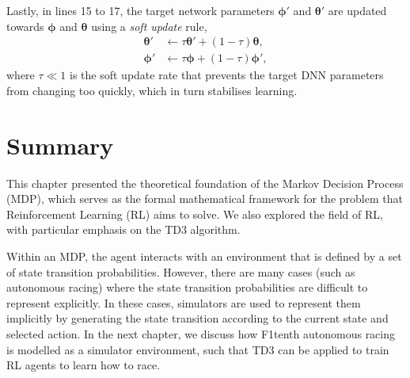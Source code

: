 Lastly, in lines 15 to 17, the target network parameters $\bm{\phi}'$ and $\bm{\theta}'$ are updated towards $\bm{\phi}$ and $\bm{\theta}$ using a \emph{soft update} rule, 
\begin{equation}
\begin{split}
    \bm{\theta}' &\leftarrow \tau \bm{\theta}' + (1 - \tau) \bm{\theta}, \\
    \bm{\phi}' &\leftarrow \tau \bm{\phi} + (1 - \tau) \bm{\phi}',
\end{split}
\end{equation}
where $\tau \ll 1$ is the soft update rate that prevents the target DNN parameters from changing too quickly, which in turn stabilises learning. 



\section{Summary}

This chapter presented the theoretical foundation of the Markov Decision Process (MDP), which serves as the formal mathematical framework for the problem that Reinforcement Learning (RL) aims to solve.
We also explored the field of RL, with particular emphasis on the TD3 algorithm.
 

Within an MDP, the agent interacts with an environment that is defined by a set of state transition probabilities. 
However, there are many cases (such as autonomous racing) where the state transition probabilities are difficult to represent explicitly.
In these cases, simulators are used to represent them implicitly by generating the state transition according to the current state and selected action.
In the next chapter, we discuss how F1tenth autonomous racing is modelled as a simulator environment, 
such that TD3 can be applied to train RL agents to learn how to race.



